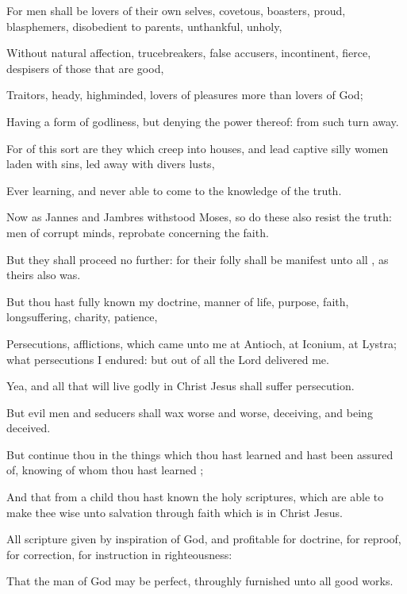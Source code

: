 {For
men shall
be lovers of their own
selves,
covetous,
boasters,
proud,
blasphemers,
disobedient to
parents,
unthankful,
unholy,

Without natural
affection,
trucebreakers, false
accusers,
incontinent,
fierce, despisers of those that are
good,

Traitors,
heady,
highminded, lovers of
pleasures
more
than lovers of
God;

Having a
form of
godliness,
but
denying the
power
thereof:
from
such turn
away.

For
of this
sort
are they which
creep
into
houses,
and lead
captive silly
women
laden with
sins, led
away with
divers
lusts,

Ever
learning,
and
never
able to
come
to the
knowledge of the
truth.

Now
as
Jannes
and
Jambres
withstood
Moses,
so
do
these
also
resist the
truth:
men of
corrupt
minds,
reprobate
concerning the
faith.

But they shall
proceed
no
further:
for
their
folly shall
be
manifest unto
all
{},
as
theirs
also
was.

But
thou hast fully
known
my
doctrine, manner of
life,
purpose,
faith,
longsuffering,
charity,
patience,

Persecutions,
afflictions,
which
came unto
me
at
Antioch,
at
Iconium,
at
Lystra;
what
persecutions I
endured:
but out
of
{}
all the
Lord
delivered
me.

Yea,
and
all that
will
live
godly
in
Christ
Jesus shall suffer
persecution.

But
evil
men
and
seducers shall
wax worse and
worse,
deceiving,
and being
deceived.

But
continue
thou
in the things
which thou hast
learned
and hast been assured
of,
knowing
of
whom thou hast
learned
{};

And
that
from a
child thou hast
known the
holy
scriptures, which are
able to
make
thee
wise
unto
salvation
through
faith which
is
in
Christ
Jesus.

All
scripture
{} given by inspiration of
God,
and
{}
profitable
for
doctrine,
for
reproof,
for
correction,
for
instruction
in
righteousness:

That the
man of
God may
be
perfect, throughly
furnished
unto
all
good
works.




\par }
